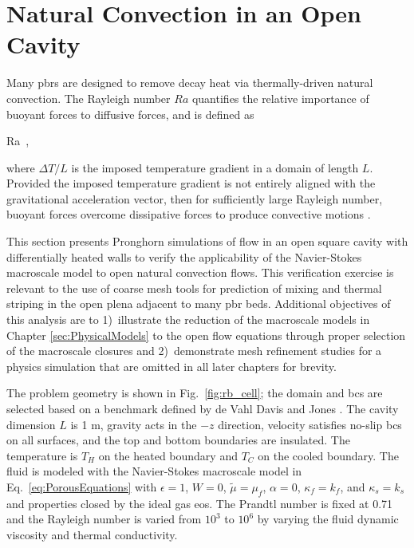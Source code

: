 \section{Natural Convection in an Open Cavity}
\label{sec:natural_convection}

Many \glspl{pbr} are designed to remove decay heat via thermally-driven natural convection. The Rayleigh number \(Ra\) quantifies the relative importance of buoyant forces to diffusive forces, and is defined as

\beq
\label{eq:RaDef}
Ra\equiv{}\ ,
\eeq

\noindent where \(\Delta T/L\) is the imposed temperature gradient in a domain of length \(L\). Provided the imposed temperature gradient is not entirely aligned with the gravitational acceleration vector, then for sufficiently large Rayleigh number, buoyant forces overcome dissipative forces to produce convective motions \cite{manneville,sandberg}.

This section presents Pronghorn simulations of flow in an open square cavity with differentially heated walls to verify the applicability of the Navier-Stokes macroscale model to open natural convection flows. This verification exercise is relevant to the use of coarse mesh tools for prediction of mixing and thermal striping in the open plena adjacent to many \gls{pbr} beds. Additional objectives of this analysis are to 1)~illustrate the reduction of the macroscale models in Chapter \ref{sec:PhysicalModels} to the open flow equations through proper selection of the macroscale closures and 2)~demonstrate mesh refinement studies for a physics simulation that are omitted in all later chapters for brevity.

The problem geometry is shown in Fig.\ \ref{fig:rb_cell}; the domain and \glspl{bc} are selected based on a benchmark defined by de Vahl Davis and Jones \cite{davis}. The cavity dimension \(L\) is 1 \si{\meter}, gravity acts in the \(-z\) direction, velocity satisfies no-slip \glspl{bc} on all surfaces, and the top and bottom boundaries are insulated. The temperature is \(T_H\) on the heated boundary and \(T_C\) on the cooled boundary. The fluid is modeled with the Navier-Stokes macroscale model in Eq.\ \eqref{eq:PorousEquations} with \(\epsilon=1\), \(W=0\), \(\tilde{\mu}=\mu_f\), \(\alpha=0\), \(\kappa_f=k_f\), and \(\kappa_s=k_s\) and properties closed by the ideal gas \gls{eos}. The Prandtl number is fixed at 0.71 and the Rayleigh number is varied from \(10^3\) to \(10^6\) by varying the fluid dynamic viscosity and thermal conductivity.

